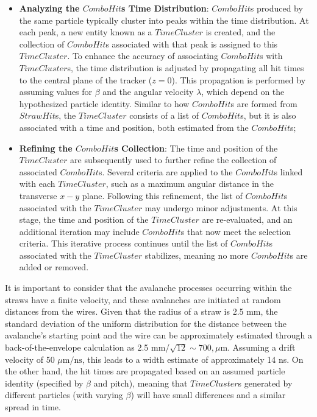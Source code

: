 \begin{itemize}
\item \textbf{Analyzing the $ComboHit$s Time Distribution}: 
$ComboHit$s produced by the same particle typically cluster 
into peaks within the time distribution. At each peak, a new 
entity known as a $TimeCluster$ is created, and the collection 
of $ComboHit$s associated with that peak is assigned to this 
$TimeCluster$. To enhance the accuracy of associating $ComboHit$s 
with $TimeCluster$s, the time distribution is adjusted by 
propagating all hit times to the central plane of the tracker 
($z = 0$). This propagation is performed by assuming values for 
$\beta$ and the angular velocity $\lambda$, which depend on the 
hypothesized particle identity. Similar to how $ComboHit$s are 
formed from $StrawHit$s, the $TimeCluster$ consists of a list of 
$ComboHit$s, but it is also associated with a time and position, 
both estimated from the $ComboHit$s;
\item \textbf{Refining the $ComboHit$s Collection}: The time and 
position of the $TimeCluster$ are subsequently used to further 
refine the collection of associated $ComboHit$s. Several criteria 
are applied to the $ComboHit$s linked with each $TimeCluster$, 
such as a maximum angular distance in the transverse $x-y$ plane. 
Following this refinement, the list of $ComboHit$s associated with 
the $TimeCluster$ may undergo minor adjustments. At this stage, 
the time and position of the $TimeCluster$ are re-evaluated, and 
an additional iteration may include $ComboHit$s that now meet 
the selection criteria. This iterative process continues until 
the list of $ComboHit$s associated with the $TimeCluster$ 
stabilizes, meaning no more $ComboHit$s are added or removed.

\end{itemize}
It is important to consider that the avalanche processes 
occurring within the straws have a finite velocity, and 
these avalanches are initiated at random distances from 
the wires. Given that the radius of a straw is 2.5 mm, 
the standard deviation of the uniform distribution for 
the distance between the avalanche's starting point and 
the wire can be approximately estimated through a 
back-of-the-envelope calculation as 2.5 mm/$\sqrt{12} \sim 700,\mu\text{m}$. 
Assuming a drift velocity of 50 $\mu\text{m}/\text{ns}$, this leads 
to a width estimate of approximately 14 ns. On the other hand, the 
hit times are propagated based on an assumed particle identity 
(specified by $\beta$ and pitch), meaning that $TimeCluster$s 
generated by different particles (with varying $\beta$) will 
have small differences and a similar spread in time.

